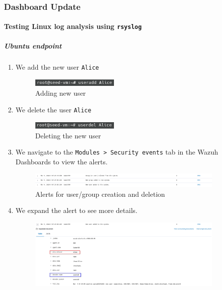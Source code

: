 \subsubsection{Dashboard Update}
\paragraph{Testing Linux log analysis using \texttt{rsyslog}}
\subparagraph{Ubuntu endpoint}
\begin{enumerate}
    \item We add the new user \texttt{Alice}
    \begin{figure} [H]
    \centering
    \includegraphics[width=0.4\textwidth]{images/log-data/7.png}
    \caption{Adding new user}
    \end{figure}
    \item We delete the user \texttt{Alice}
    \begin{figure} [H]
    \centering
    \includegraphics[width=0.4\textwidth]{images/log-data/8.png}
    \caption{Deleting the new user}
    \end{figure}
    \item We navigate to the \texttt{Modules > Security events} tab in the Wazuh Dashboards to view the alerts. 
    \begin{figure} [H]
    \centering
    \includegraphics[width=0.9\textwidth]{images/log-data/4.png}
    \caption{Alerts for user/group creation and deletion}
    \end{figure}
    \item We expand the alert to see more details.
    \begin{figure} [H]
    \centering
    \includegraphics[width=0.9\textwidth]{images/log-data/5.png}

\end{figure}
\end{enumerate}
